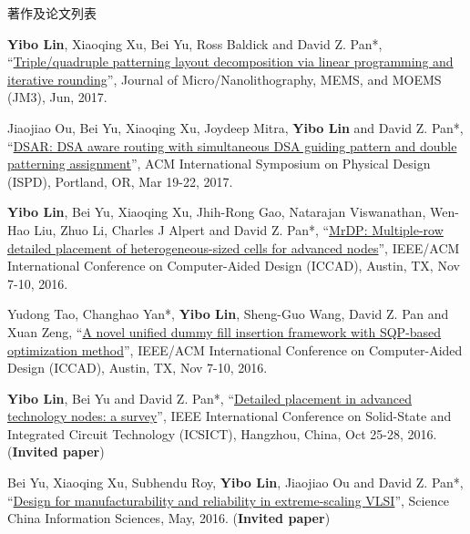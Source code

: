 \begin{rSection}{著作及论文列表}
\begin{description}[font=\normalfont, rightmargin=2em]
\item[{[J12]}]{
        \textbf{Yibo Lin}, Xiaoqing Xu, Bei Yu, Ross Baldick and David Z. Pan*, 
    ``\href{http://dx.doi.org/10.1117/1.JMM.16.2.023507}{Triple/quadruple patterning layout decomposition via linear programming and iterative rounding}'', 
    Journal of Micro/Nanolithography, MEMS, and MOEMS (JM3), Jun, 2017.
    
}
            

\item[{[C11]}]{
        Jiaojiao Ou, Bei Yu, Xiaoqing Xu, Joydeep Mitra, \textbf{Yibo Lin} and David Z. Pan*, 
    ``\href{https://doi.org/10.1145/3036669.3036677}{DSAR: DSA aware routing with simultaneous DSA guiding pattern and double patterning assignment}'', 
    ACM International Symposium on Physical Design (ISPD), Portland, OR, Mar 19-22, 2017.
    
}
            

\item[{[C10]}]{
        \textbf{Yibo Lin}, Bei Yu, Xiaoqing Xu, Jhih-Rong Gao, Natarajan Viswanathan, Wen-Hao Liu, Zhuo Li, Charles J Alpert and David Z. Pan*, 
    ``\href{http://dx.doi.org/10.1145/2966986.2967055}{MrDP: Multiple-row detailed placement of heterogeneous-sized cells for advanced nodes}'', 
    IEEE/ACM International Conference on Computer-Aided Design (ICCAD), Austin, TX, Nov 7-10, 2016.
    
}
            

\item[{[C9]}]{
        Yudong Tao, Changhao Yan*, \textbf{Yibo Lin}, Sheng-Guo Wang, David Z. Pan and Xuan Zeng, 
    ``\href{http://dx.doi.org/10.1145/2966986.2966994}{A novel unified dummy fill insertion framework with SQP-based optimization method}'', 
    IEEE/ACM International Conference on Computer-Aided Design (ICCAD), Austin, TX, Nov 7-10, 2016.
    
}
            

\item[{[C8]}]{
        \textbf{Yibo Lin}, Bei Yu and David Z. Pan*, 
    ``\href{https://doi.org/10.1109/ICSICT.2016.7999056}{Detailed placement in advanced technology nodes: a survey}'', 
    IEEE International Conference on Solid-State and Integrated Circuit Technology (ICSICT), Hangzhou, China, Oct 25-28, 2016.
    (\textbf{Invited paper})
}
            

\item[{[J7]}]{
        Bei Yu, Xiaoqing Xu, Subhendu Roy, \textbf{Yibo Lin}, Jiaojiao Ou and David Z. Pan*, 
    ``\href{http://link.springer.com/article/10.1007%2Fs11432-016-5560-6}{Design for manufacturability and reliability in extreme-scaling {VLSI}}'', 
    Science China Information Sciences, May, 2016.
    (\textbf{Invited paper})
}
            


\end{description}
\end{rSection}
